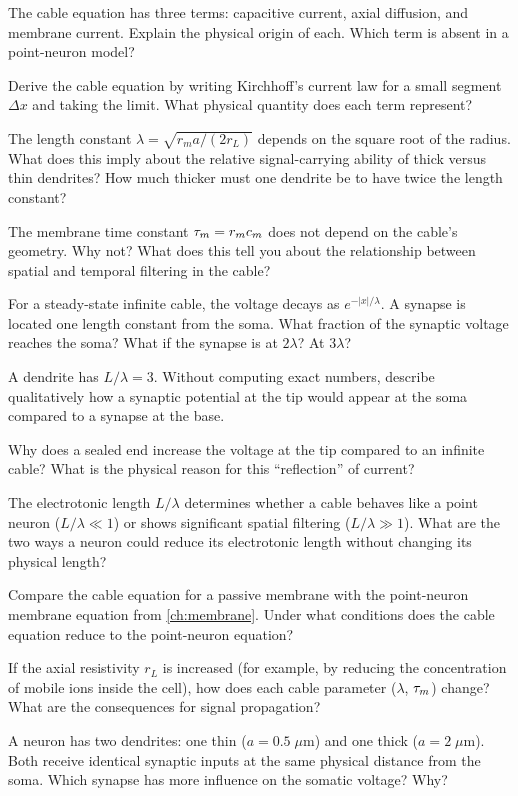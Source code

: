 \begin{conceptquestions}
  \item The cable equation has three terms: capacitive current, axial diffusion, and membrane current. Explain the physical origin of each. Which term is absent in a point-neuron model?

  \item Derive the cable equation by writing Kirchhoff's current law for a small segment $\Delta x$ and taking the limit. What physical quantity does each term represent?

  \item The length constant $\lambda = \sqrt{r_m a / (2r_L)}$ depends on the square root of the radius. What does this imply about the relative signal-carrying ability of thick versus thin dendrites? How much thicker must one dendrite be to have twice the length constant?

  \item The membrane time constant $\tau_m = r_m c_m$ does not depend on the cable's geometry. Why not? What does this tell you about the relationship between spatial and temporal filtering in the cable?

  \item For a steady-state infinite cable, the voltage decays as $e^{-|x|/\lambda}$. A synapse is located one length constant from the soma. What fraction of the synaptic voltage reaches the soma? What if the synapse is at $2\lambda$? At $3\lambda$?

  \item A dendrite has $L/\lambda = 3$. Without computing exact numbers, describe qualitatively how a synaptic potential at the tip would appear at the soma compared to a synapse at the base.

  \item Why does a sealed end increase the voltage at the tip compared to an infinite cable? What is the physical reason for this ``reflection'' of current?

  \item The electrotonic length $L/\lambda$ determines whether a cable behaves like a point neuron ($L/\lambda \ll 1$) or shows significant spatial filtering ($L/\lambda \gg 1$). What are the two ways a neuron could reduce its electrotonic length without changing its physical length?

  \item Compare the cable equation for a passive membrane with the point-neuron membrane equation from \cref{ch:membrane}. Under what conditions does the cable equation reduce to the point-neuron equation?

  \item If the axial resistivity $r_L$ is increased (for example, by reducing the concentration of mobile ions inside the cell), how does each cable parameter ($\lambda$, $\tau_m$) change? What are the consequences for signal propagation?

  \item A neuron has two dendrites: one thin ($a = 0.5\;\mu\text{m}$) and one thick ($a = 2\;\mu\text{m}$). Both receive identical synaptic inputs at the same physical distance from the soma. Which synapse has more influence on the somatic voltage? Why?
\end{conceptquestions}
